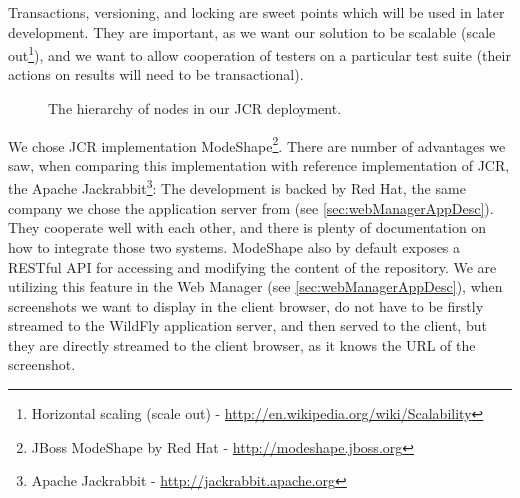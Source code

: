\documentclass[11pt,oneside,final]{fithesis2}
\begin{document}
    Transactions, versioning, and locking are sweet points which will be used in later development. They are important, as we want
    our solution to be scalable 
    (scale out\footnote{Horizontal scaling (scale out) - \url{http://en.wikipedia.org/wiki/Scalability}}),
    and we want to allow cooperation of testers on a particular test suite (their actions on results will need to be transactional).
    
    \begin{figure}[!htb]
      \begin{center}
      \leavevmode
      \centerline{}
      \end{center}
      \caption{The hierarchy of nodes in our JCR deployment.}
      \label{fig:ourJCRHierarchy}
    \end{figure}
    
    \label{sec:whyWeChooseJCR}
    We chose JCR implementation ModeShape\footnote{JBoss ModeShape by Red Hat - \url{http://modeshape.jboss.org}}. There are number
    of advantages we saw, when comparing this implementation with reference implementation of JCR, the Apache 
    Jackrabbit\footnote{Apache Jackrabbit - \url{http://jackrabbit.apache.org}}: The development is backed by Red Hat, the same 
    company we chose the application server from (see \ref{sec:webManagerAppDesc}). 
    They cooperate well with each other, and there is plenty of documentation on how to integrate those two systems.
    ModeShape also by default exposes a RESTful API for accessing and modifying the content of the repository. We are utilizing 
    this feature in the Web Manager (see \ref{sec:webManagerAppDesc}), when screenshots we want to display in the client browser,
    do not have to be firstly streamed to the WildFly application server, and then served to the client, but they are directly
    streamed to the client browser, as it knows the URL of the screenshot.
    
\end{document}
